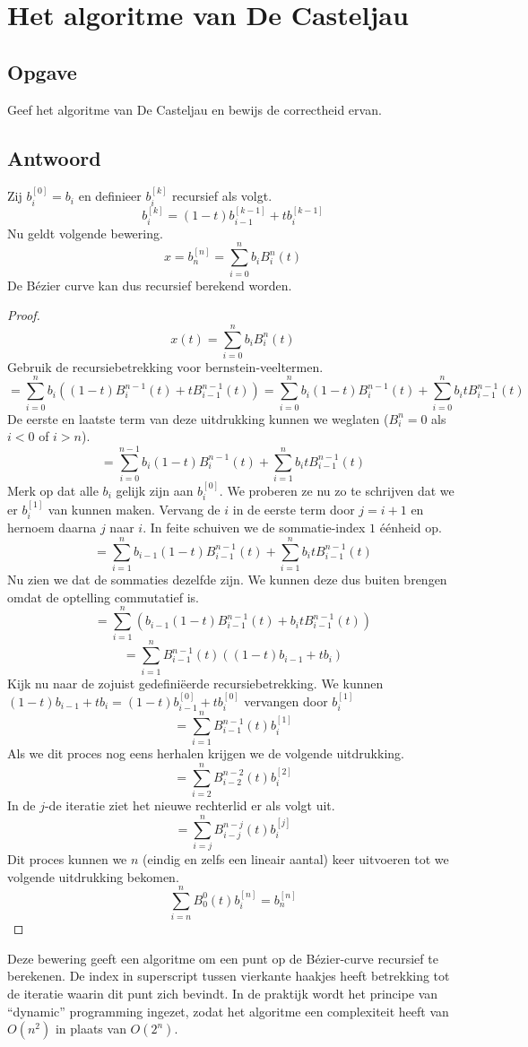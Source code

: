 \documentclass[examenvragen.tex]{subfiles}
\begin{document}
\section{Het algoritme van De Casteljau}
\subsection{Opgave}
Geef het algoritme van De Casteljau en bewijs de correctheid ervan.

\subsection{Antwoord}
Zij $b_{i}^{[0]} = b_{i}$ en definieer $b_{i}^{[k]}$ recursief als volgt.
\[
b_{i}^{[k]}
=
(1-t)b_{i-1}^{[k-1]} + tb_{i}^{[k-1]}
\]
Nu geldt volgende bewering.
\[
x = b_{n}^{[n]} = \sum_{i=0}^{n}b_iB_{i}^{n}(t)
\]
De B\'ezier curve kan dus recursief berekend worden.
\begin{proof}
\[
x(t) = \sum_{i=0}^{n}b_iB_{i}^{n}(t)
\]
Gebruik de recursiebetrekking voor bernstein-veeltermen.
\[
= \sum_{i=0}^{n}b_i
\left( 
(1-t)B^{n-1}_{i}(t) + tB^{n-1}_{i-1}(t)
\right)
= 
\sum_{i=0}^{n}b_i
(1-t)B^{n-1}_{i}(t) + 
\sum_{i=0}^{n}b_it
B^{n-1}_{i-1}(t)
\]
De eerste en laatste term van deze uitdrukking kunnen we weglaten ($B_{i}^{n} = 0$ als $i < 0$ of $i > n$).
\[
= 
\sum_{i=0}^{n-1}b_i
(1-t)B^{n-1}_{i}(t) + 
\sum_{i=1}^{n}b_it
B^{n-1}_{i-1}(t)
\]
Merk op dat alle $b_i$ gelijk zijn aan $b_i^{[0]}$. We proberen ze nu zo te schrijven dat we er $b_i^{[1]}$ van kunnen maken. Vervang de $i$ in de eerste term door $j=i+1$ en hernoem daarna $j$ naar $i$. In feite schuiven we de sommatie-index $1$ \'e\'enheid op.
\[
= 
\sum_{i=1}^{n}b_{i-1}
(1-t)B^{n-1}_{i-1}(t) + 
\sum_{i=1}^{n}b_it
B^{n-1}_{i-1}(t)
\]
Nu zien we dat de sommaties dezelfde zijn. We kunnen deze dus buiten brengen omdat de optelling commutatief is.
\[
= 
\sum_{i=1}^{n}
\left(
b_{i-1}(1-t)B^{n-1}_{i-1}(t)
+ 
b_itB^{n-1}_{i-1}(t)
\right)
\]
\[
= 
\sum_{i=1}^{n}
B^{n-1}_{i-1}(t)
\left(
(1-t)b_{i-1}
+ 
tb_i
\right)
\]
Kijk nu naar de zojuist gedefini\"eerde recursiebetrekking. We kunnen $(1-t)b_{i-1} + tb_i = (1-t)b_{i-1}^{[0]} + tb_i^{[0]}$ vervangen door $b_{i}^{[1]}$
\[
= 
\sum_{i=1}^{n}
B^{n-1}_{i-1}(t)
b_{i}^{[1]}
\]
Als we dit proces nog eens herhalen krijgen we de volgende uitdrukking.
\[
= 
\sum_{i=2}^{n}
B^{n-2}_{i-2}(t)
b_{i}^{[2]}
\]
In de $j$-de iteratie ziet het nieuwe rechterlid er als volgt uit.
\[
= 
\sum_{i=j}^{n}
B^{n-j}_{i-j}(t)
b_{i}^{[j]}
\]
Dit proces kunnen we $n$ (eindig en zelfs een lineair aantal) keer uitvoeren tot we volgende uitdrukking bekomen.
\[
\sum_{i=n}^{n}
B^{0}_{0}(t)
b_{i}^{[n]}
= b_{n}^{[n]}
\]
\end{proof}
Deze bewering geeft een algoritme om een punt op de B\'ezier-curve recursief te berekenen. De index in superscript tussen vierkante haakjes heeft betrekking tot de iteratie waarin dit punt zich bevindt. In de praktijk wordt het principe van ``dynamic'' programming ingezet, zodat het algoritme een complexiteit heeft van $O(n^2)$ in plaats van $O(2^n)$.
\end{document}

